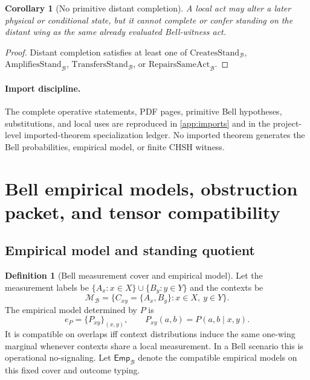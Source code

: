 \documentclass[11pt]{article}
\newtheorem{corollary}[theorem]{Corollary}
\theoremstyle{definition}
\newtheorem{definition}[theorem]{Definition}
\newcommand{\Bell}{\mathcal{B}}
\newcommand{\BellEmp}{\mathsf{Emp}_{\Bell}}
\newcommand{\CreatesStand}{\mathrm{CreatesStand}_{\Bell}}
\newcommand{\AmplifiesStand}{\mathrm{AmplifiesStand}_{\Bell}}
\newcommand{\TransfersStand}{\mathrm{TransfersStand}_{\Bell}}
\newcommand{\RepairsAct}{\mathrm{RepairsSameAct}_{\Bell}}
\begin{document}
\begin{corollary}[No primitive distant completion]
A local act may alter a later physical or conditional state, but it cannot complete or confer standing on the distant wing as the same already evaluated Bell-witness act.
\end{corollary}
\begin{proof}
Distant completion satisfies at least one of $\CreatesStand$, $\AmplifiesStand$, $\TransfersStand$, or $\RepairsAct$.
\end{proof}

\paragraph{Import discipline.}
The complete operative statements, PDF pages, primitive Bell hypotheses, substitutions, and local uses are reproduced in \cref{app:imports} and in the project-level imported-theorem specialization ledger. No imported theorem generates the Bell probabilities, empirical model, or finite CHSH witness.

\section{Bell empirical models, obstruction packet, and tensor compatibility}\label{sec:jointstanding}

\subsection{Empirical model and standing quotient}

\begin{definition}[Bell measurement cover and empirical model]\label{def:empiricalmodel}
Let the measurement labels be $\{A_x:x\in X\}\cup\{B_y:y\in Y\}$ and the contexts be
\[
\mathcal M_{\Bell}=\{C_{xy}=\{A_x,B_y\}:x\in X,\ y\in Y\}.
\]
The empirical model determined by $P$ is
\[
e_P=\{P_{xy}\}_{(x,y)},\qquad P_{xy}(a,b)=P(a,b\mid x,y).
\]
It is compatible on overlaps iff context distributions induce the same one-wing marginal whenever contexts share a local measurement. In a Bell scenario this is operational no-signaling. Let $\BellEmp$ denote the compatible empirical models on this fixed cover and outcome typing.
\end{definition}
\end{document}
